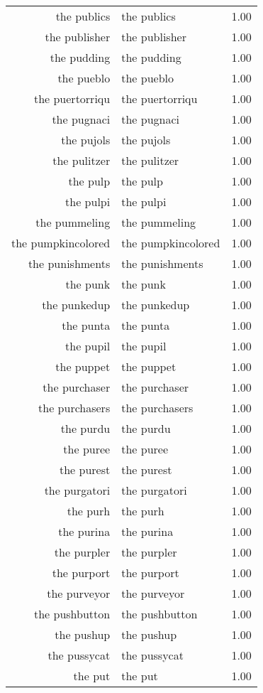 \begin{table}[ht]
\begin{tabular}{rlr}
  the publics & the publics & 1.00 \\ 
  the publisher & the publisher & 1.00 \\ 
  the pudding & the pudding & 1.00 \\ 
  the pueblo & the pueblo & 1.00 \\ 
  the puertorriqu & the puertorriqu & 1.00 \\ 
  the pugnaci & the pugnaci & 1.00 \\ 
  the pujols & the pujols & 1.00 \\ 
  the pulitzer & the pulitzer & 1.00 \\ 
  the pulp & the pulp & 1.00 \\ 
  the pulpi & the pulpi & 1.00 \\ 
  the pummeling & the pummeling & 1.00 \\ 
  the pumpkincolored & the pumpkincolored & 1.00 \\ 
  the punishments & the punishments & 1.00 \\ 
  the punk & the punk & 1.00 \\ 
  the punkedup & the punkedup & 1.00 \\ 
  the punta & the punta & 1.00 \\ 
  the pupil & the pupil & 1.00 \\ 
  the puppet & the puppet & 1.00 \\ 
  the purchaser & the purchaser & 1.00 \\ 
  the purchasers & the purchasers & 1.00 \\ 
  the purdu & the purdu & 1.00 \\ 
  the puree & the puree & 1.00 \\ 
  the purest & the purest & 1.00 \\ 
  the purgatori & the purgatori & 1.00 \\ 
  the purh & the purh & 1.00 \\ 
  the purina & the purina & 1.00 \\ 
  the purpler & the purpler & 1.00 \\ 
  the purport & the purport & 1.00 \\ 
  the purveyor & the purveyor & 1.00 \\ 
  the pushbutton & the pushbutton & 1.00 \\ 
  the pushup & the pushup & 1.00 \\ 
  the pussycat & the pussycat & 1.00 \\ 
  the put & the put & 1.00 \\ 

\end{tabular}
\end{table}
